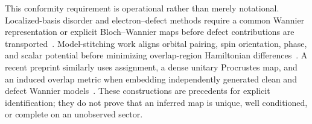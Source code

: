 This conformity requirement is operational rather than merely notational.
Localized-basis disorder and electron--defect methods require a common Wannier
representation or explicit Bloch--Wannier maps before defect contributions are
transported~\cite{berlijnVoljaKu2011,luParkZhouBernardi2020}. Model-stitching
work aligns orbital pairing, spin orientation, phase, and scalar potential
before minimizing overlap-region Hamiltonian differences~\cite{lihmPark2019}.
A recent preprint similarly uses assignment, a dense unitary Procrustes map, and
an induced overlap metric when embedding independently generated clean and
defect Wannier models~\cite{shiXieZhangChuGong2026}. These constructions are
precedents for explicit identification; they do not prove that an inferred map
is unique, well conditioned, or complete on an unobserved sector.
